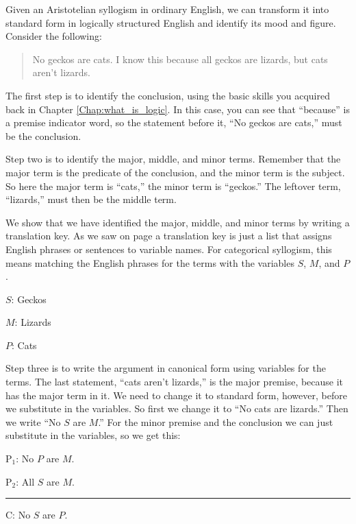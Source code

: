 Given an Aristotelian syllogism in ordinary English, we can transform it into standard form in logically structured English and identify its mood and figure. Consider the following: 

\begin{quotation}
\noindent No geckos are cats. I know this because all geckos are lizards, but cats aren't lizards.
\end{quotation}

The first step is to identify the conclusion, using the basic skills you acquired back in Chapter \ref{Chap:what_is_logic}. In this case, you can see that ``because'' is a premise indicator word, so the statement before it, ``No geckos are cats,'' must be the conclusion.

Step two is to identify the major, middle, and minor terms. Remember that the major term is the predicate of the conclusion, and the minor term is the subject. So here the major term is ``cats,'' the minor term is ``geckos.'' The leftover term, ``lizards,'' must then be the middle term. 

We show that we have identified the major, middle, and minor terms by writing a \gls{translation key}\label{def:translation_key}. As we saw on page \pageref{def:translation_key} a translation key is just a list that assigns English phrases or sentences to variable names. For categorical syllogism, this means matching the English phrases for the terms with the variables $S$, $M$, and $P$. 

\begin{ekey}
\item[$S$:] Geckos
\item[$M$:] Lizards
\item[$P$:] Cats
\end{ekey}

Step three is to write the argument in canonical form using variables for the terms. The last statement, ``cats aren't lizards,'' is the major premise, because it has the major term in it. We need to change it to standard form, however, before we substitute in the variables. So first we change it to ``No cats are lizards.'' Then we write ``No $S$ are $M$.'' For the minor premise and the conclusion we can just substitute in the variables, so we get this:
 
\begin{earg}
\item[P$_1$:] No $P$ are $M$.
\item[P$_2$:] All $S$ are $M$.
\vspace{-.5em}
\item [] \rule{0.15\linewidth}{.5pt} 
\item[C:] No $S$ are $P$. 
\end{earg} 

